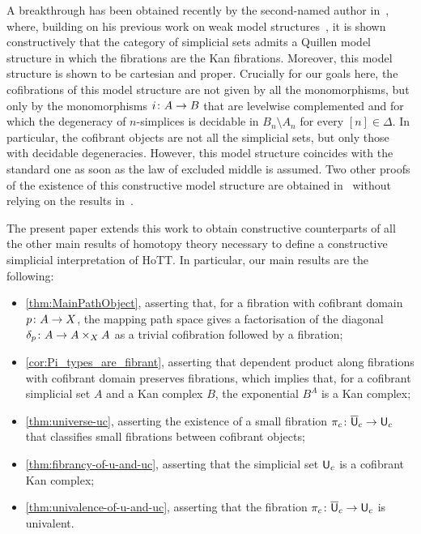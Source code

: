 \documentclass[reqno,10pt,a4paper,oneside,draft]{amsart}
\begin{document}
A breakthrough has been obtained recently by the second-named author in~\cite{henry2019qms}, where, building on his previous work on weak model structures~\cite{henry2018wms},
it is shown constructively that the category of simplicial sets admits a Quillen model structure in which the
fibrations are the Kan fibrations. Moreover, this model structure is shown to be cartesian and proper.  Crucially for our goals here, 
the cofibrations of this model structure are not given by all the monomorphisms, but only by the monomorphisms $i \colon A \to B$ that are levelwise complemented 
and for which the degeneracy of $n$-simplices is decidable in $B_n \setminus A_n$ for every $[n] \in \Delta$. In particular, the cofibrant objects are not all the simplicial sets, but only those with decidable degeneracies. However, this model structure coincides with
the standard one as soon as the law of excluded middle is assumed. Two other  
proofs of the  existence of this constructive
model structure are obtained in~\cite{GambinoN:anocp} without relying on the results in~\cite{henry2018wms}. 


The present paper extends this work to obtain constructive counterparts of all the other main results of 
homotopy theory necessary to define a constructive simplicial interpretation of HoTT. In particular, our main results are the following:
\begin{itemize}
\item \cref{thm:MainPathObject}, asserting that, for a fibration with cofibrant domain $p \colon A \to X$, the mapping path space 
gives a factorisation of the diagonal $\delta_p \colon A \to A \times_X A$ as a trivial cofibration followed by a fibration;
\item \cref{cor:Pi_types_are_fibrant}, asserting that dependent product along fibrations with cofibrant
domain preserves fibrations, which implies that, for a cofibrant simplicial set $A$ and a Kan complex $B$, the exponential $B^A$ is a Kan complex; 
\item \cref{thm:universe-uc}, asserting the existence of a small fibration $\pi_c \colon
\overline{\mathsf{U}}_c \to \mathsf{U}_c$ that classifies small fibrations between cofibrant objects;
\item \cref{thm:fibrancy-of-u-and-uc}, asserting that the simplicial set $\mathsf{U}_c$ is a cofibrant Kan complex;
\item \cref{thm:univalence-of-u-and-uc}, asserting that the fibration $\pi_c  \colon
\overline{\mathsf{U}}_c \to \mathsf{U}_c$ is univalent.
\end{itemize}
\end{document}

